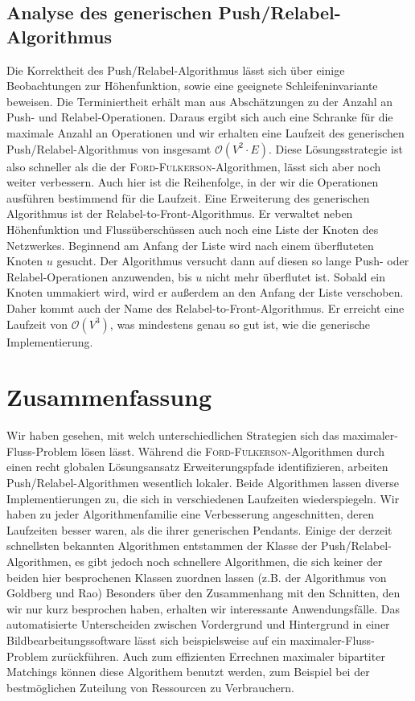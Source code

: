 \documentclass[12pt,a4paper,titlepage,onecolumn,ngerman,bibliography=totocnumbered]{scrartcl}
\theoremstyle{definition}
\theoremstyle{remark}
\newcommand{\ff}{\textsc{Ford-Fulkerson}}
\newcommand{\pr}{Push/Relabel}
\begin{document}
\subsection{Analyse des generischen \pr -Algorithmus}
Die Korrektheit des \pr -Algorithmus lässt sich über einige Beobachtungen zur Höhenfunktion, sowie eine geeignete Schleifeninvariante beweisen.
Die Terminiertheit erhält man aus Abschätzungen zu der Anzahl an Push- und Relabel-Operationen.
Daraus ergibt sich auch eine Schranke für die maximale Anzahl an Operationen und wir erhalten eine Laufzeit des generischen \pr -Algorithmus von insgesamt $\mathcal{O}(V^2 \cdot E)$.
Diese Lösungsstrategie ist also schneller als die der \ff -Algorithmen, lässt sich aber noch weiter verbessern.
Auch hier ist die Reihenfolge, in der wir die Operationen ausführen bestimmend für die Laufzeit.
Eine Erweiterung des generischen Algorithmus ist der Relabel-to-Front-Algorithmus.
Er verwaltet neben Höhenfunktion und Flussüberschüssen auch noch eine Liste der Knoten des Netzwerkes.
Beginnend am Anfang der Liste wird nach einem überfluteten Knoten $u$ gesucht.
Der Algorithmus versucht dann auf diesen so lange Push- oder Relabel-Operationen anzuwenden, bis $u$ nicht mehr überflutet ist.
Sobald ein Knoten ummakiert wird, wird er außerdem an den Anfang der Liste verschoben.
Daher kommt auch der Name des Relabel-to-Front-Algorithmus.
Er erreicht eine Laufzeit von $\mathcal{O}(V^3)$, was mindestens genau so gut ist, wie die generische Implementierung.

\section{Zusammenfassung}
Wir haben gesehen, mit welch unterschiedlichen Strategien sich das maximaler-Fluss-Problem lösen lässt.
Während die \ff -Algorithmen durch einen recht globalen Lösungsansatz Erweiterungspfade identifizieren, arbeiten \pr -Algorithmen wesentlich lokaler.
Beide Algorithmen lassen diverse Implementierungen zu, die sich in verschiedenen Laufzeiten wiederspiegeln.
Wir haben zu jeder Algorithmenfamilie eine Verbesserung angeschnitten, deren Laufzeiten besser waren, als die ihrer generischen Pendants.
Einige der derzeit schnellsten bekannten Algorithmen entstammen der Klasse der \pr -Algorithmen, es gibt jedoch noch schnellere Algorithmen, die sich keiner der beiden hier besprochenen Klassen zuordnen lassen (z.B. der Algorithmus von Goldberg und Rao)
\medbreak
Besonders über den Zusammenhang mit den Schnitten, den wir nur kurz besprochen haben, erhalten wir interessante Anwendungsfälle.
Das automatisierte Unterscheiden zwischen Vordergrund und Hintergrund in einer Bildbearbeitungssoftware lässt sich beispielsweise auf ein maximaler-Fluss-Problem zurückführen.
Auch zum effizienten Errechnen maximaler bipartiter Matchings können diese Algorithem benutzt werden, zum Beispiel bei der bestmöglichen Zuteilung von Ressourcen zu Verbrauchern.
\newpage
\printbibliography
\end{document}
